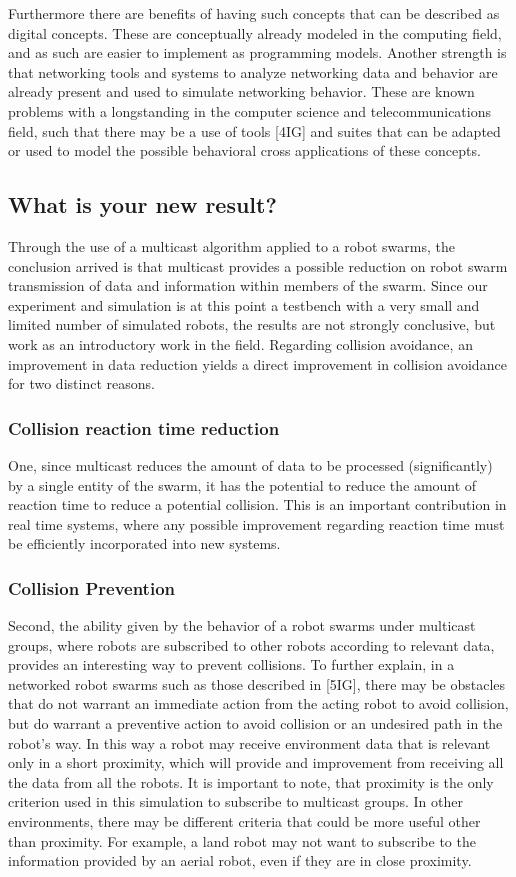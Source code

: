 \documentclass[journal]{IEEEtran}
\begin{document}
Furthermore there are benefits of having such concepts that can be described as digital concepts. These are conceptually already modeled in the computing field, and as such are easier to implement as programming models. 
Another strength is that networking tools and systems to analyze networking data and behavior are already present and used to simulate networking behavior. These are known problems with a longstanding in the computer science and telecommunications field, such that there may be a use of tools [4IG] and suites that can be adapted or used to model the possible behavioral cross applications of these concepts.


\subsection{What is your new result?}
Through the use of a multicast algorithm applied to a robot swarms, the conclusion arrived is that multicast provides a possible reduction on robot swarm transmission of data and information within members of the swarm. Since our experiment and simulation is at this point a testbench with a very small and limited number of simulated robots, the results are not strongly conclusive, but work as an introductory work in the field.  
Regarding collision avoidance, an improvement in data reduction yields a direct improvement in collision avoidance for two distinct reasons. 
\subsubsection{Collision reaction time reduction}
One, since multicast reduces the amount of data to be processed (significantly) by a single entity of the swarm, it has the potential to reduce the amount of reaction time to reduce a potential collision. This is an important contribution in real time systems, where any possible improvement regarding reaction time must be efficiently incorporated into new systems.
\subsubsection{Collision Prevention}
Second, the ability given by the behavior of a robot swarms under multicast groups, where robots are subscribed to other robots according to relevant data, provides an interesting way to prevent collisions. To further explain, in a networked robot swarms such as those described in [5IG], there may be obstacles that do not warrant an immediate action from the acting robot to avoid collision, but do warrant a preventive action to avoid collision or an undesired path in the robot’s way. In this way a robot may receive environment data that is relevant only in a short proximity, which will provide and improvement from receiving all the data from all the robots. It is important to note, that proximity is the only criterion used in this simulation to subscribe to multicast groups. In other environments, there may be different criteria that could be more useful other than proximity. For example, a land robot may not want to subscribe to the information provided by an aerial robot, even if they are in close proximity.
\end{document}
